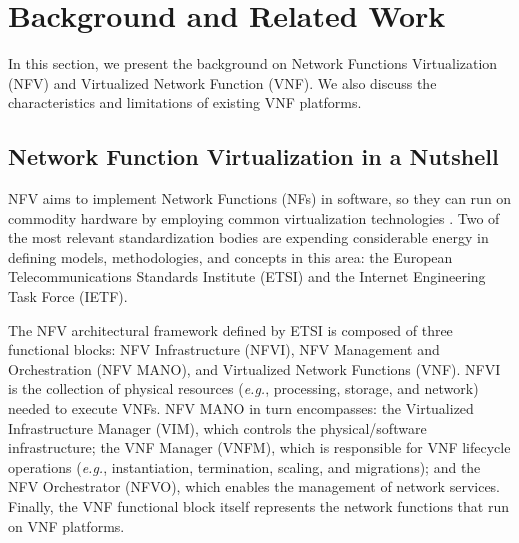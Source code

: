 \section{Background and Related Work} \label{BACK}

In this section, we present the background on Network Functions Virtualization (NFV) and Virtualized Network Function (VNF). We also discuss the characteristics and limitations of existing VNF platforms.

\subsection{Network Function Virtualization in a Nutshell} \label{VISAO}

NFV aims to implement Network Functions (NFs) in software, so they can run on commodity hardware by employing common virtualization technologies \cite{ETSI-2012}. Two of the most relevant standardization bodies are expending considerable energy in defining models, methodologies, and concepts in this area: the European Telecommunications Standards Institute (ETSI) and the Internet Engineering Task Force (IETF).

The NFV architectural framework \cite{GS-2014} defined by ETSI is composed of three functional blocks: NFV Infrastructure (NFVI), NFV Management and Orchestration (NFV MANO), and Virtualized Network Functions (VNF). NFVI is the collection of physical resources (\textit{e.g.}, processing, storage, and network) needed to execute VNFs. NFV MANO in turn encompasses: the Virtualized Infrastructure Manager (VIM), which controls the physical/software infrastructure; the VNF Manager (VNFM), which is responsible for VNF lifecycle operations (\textit{e.g.}, instantiation, termination, scaling, and migrations); and the NFV Orchestrator (NFVO), which enables the management of network services. Finally, the VNF functional block itself represents the network functions that run on VNF platforms.



